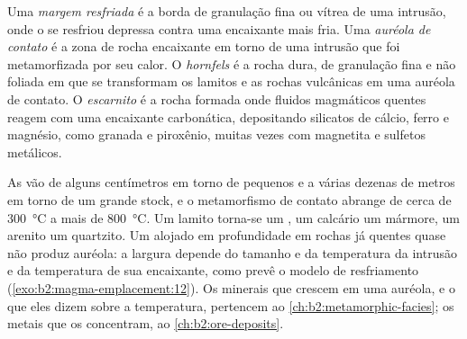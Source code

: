 \begin{definition}\label{def:b2:magma-emplacement:aureole}
Uma \emph{margem resfriada} é a borda de granulação fina ou vítrea de uma
intrusão, onde o  se resfriou depressa contra uma encaixante mais fria. Uma
\emph{auréola de contato} é a zona de rocha encaixante em torno de uma
intrusão que foi metamorfizada por seu calor. O \emph{hornfels} é a
rocha dura, de granulação fina e não foliada em que se transformam os lamitos e as rochas vulcânicas em
uma auréola de contato. O \emph{escarnito} é a rocha formada onde fluidos
magmáticos quentes reagem com uma encaixante carbonática, depositando silicatos de cálcio, ferro e
magnésio, como granada e piroxênio, muitas vezes com magnetita e sulfetos metálicos.
\end{definition}

As  vão de alguns centímetros em torno de pequenos  e  a
várias dezenas de metros em torno de um grande stock, e o metamorfismo de contato abrange
de cerca de \qty{300}{\celsius} a mais de \qty{800}{\celsius}. Um lamito torna-se um
, um calcário um mármore, um arenito um quartzito. Um  alojado em profundidade
em rochas já quentes quase não produz auréola: a largura depende do
tamanho e da temperatura da intrusão e da temperatura de sua encaixante, como
prevê o modelo de resfriamento (\cref{exo:b2:magma-emplacement:12}). Os minerais que crescem em uma auréola,
e o que eles dizem sobre a temperatura, pertencem ao \cref{ch:b2:metamorphic-facies};
os metais que os  concentram, ao \cref{ch:b2:ore-deposits}.

